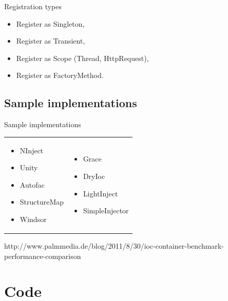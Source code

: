 \documentclass{beamer}
\begin{document}
\begin{frame}{Registration types}
\Large{\begin{itemize}
	\item Register as Singleton,
	\item Register as Transient,
	\item Register as Scope (Thread, HttpRequest),
	\item Register as FactoryMethod.
\end{itemize}}
\end{frame}

\subsection*{Sample implementations}

\begin{frame}{Sample implementations}
\begin{table}
	\begin{tabular}{ p{5cm} p{5cm} }
	
	\begin{minipage}{.5\textwidth}
\Large{\begin{itemize}
	\item NInject
	\item Unity
	\item Autofac
	\item StructureMap
	\item Windsor
\end{itemize}}
   	 \end{minipage}
   	 &
	\begin{minipage}{.5\textwidth}
\Large{\begin{itemize}
	\item Grace
	\item DryIoc
	\item LightInject
	\item SimpleInjector
\end{itemize}}
   	 \end{minipage}

	\end{tabular}
\end{table}
http://www.palmmedia.de/blog/2011/8/30/ioc-container-benchmark-performance-comparison
\end{frame}


\section{Code}
\end{document}

